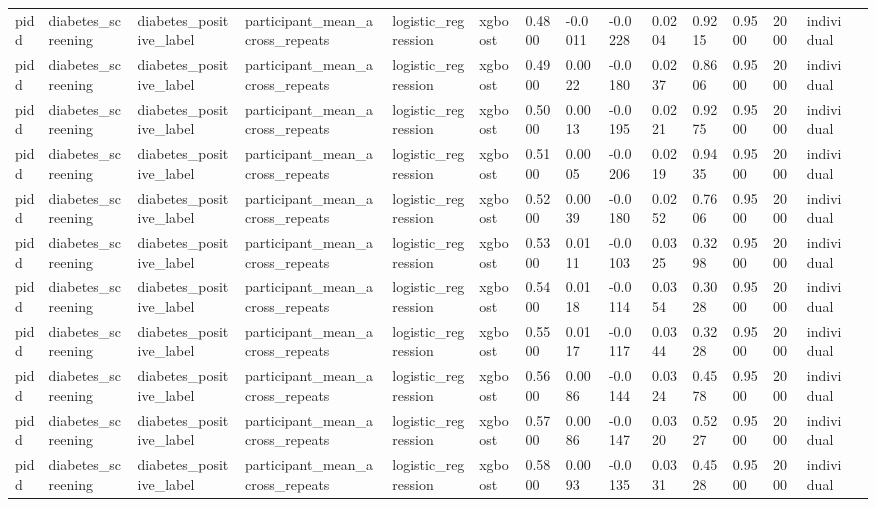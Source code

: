 \begin{tabular}{lllllllllllllll}
pidd & diabetes\_screening & diabetes\_positive\_label & participant\_mean\_across\_repeats & logistic\_regression & xgboost & 0.4800 & -0.0011 & -0.0228 & 0.0204 & 0.9215 & 0.9500 & 2000 & individual &  \\
pidd & diabetes\_screening & diabetes\_positive\_label & participant\_mean\_across\_repeats & logistic\_regression & xgboost & 0.4900 & 0.0022 & -0.0180 & 0.0237 & 0.8606 & 0.9500 & 2000 & individual &  \\
pidd & diabetes\_screening & diabetes\_positive\_label & participant\_mean\_across\_repeats & logistic\_regression & xgboost & 0.5000 & 0.0013 & -0.0195 & 0.0221 & 0.9275 & 0.9500 & 2000 & individual &  \\
pidd & diabetes\_screening & diabetes\_positive\_label & participant\_mean\_across\_repeats & logistic\_regression & xgboost & 0.5100 & 0.0005 & -0.0206 & 0.0219 & 0.9435 & 0.9500 & 2000 & individual &  \\
pidd & diabetes\_screening & diabetes\_positive\_label & participant\_mean\_across\_repeats & logistic\_regression & xgboost & 0.5200 & 0.0039 & -0.0180 & 0.0252 & 0.7606 & 0.9500 & 2000 & individual &  \\
pidd & diabetes\_screening & diabetes\_positive\_label & participant\_mean\_across\_repeats & logistic\_regression & xgboost & 0.5300 & 0.0111 & -0.0103 & 0.0325 & 0.3298 & 0.9500 & 2000 & individual &  \\
pidd & diabetes\_screening & diabetes\_positive\_label & participant\_mean\_across\_repeats & logistic\_regression & xgboost & 0.5400 & 0.0118 & -0.0114 & 0.0354 & 0.3028 & 0.9500 & 2000 & individual &  \\
pidd & diabetes\_screening & diabetes\_positive\_label & participant\_mean\_across\_repeats & logistic\_regression & xgboost & 0.5500 & 0.0117 & -0.0117 & 0.0344 & 0.3228 & 0.9500 & 2000 & individual &  \\
pidd & diabetes\_screening & diabetes\_positive\_label & participant\_mean\_across\_repeats & logistic\_regression & xgboost & 0.5600 & 0.0086 & -0.0144 & 0.0324 & 0.4578 & 0.9500 & 2000 & individual &  \\
pidd & diabetes\_screening & diabetes\_positive\_label & participant\_mean\_across\_repeats & logistic\_regression & xgboost & 0.5700 & 0.0086 & -0.0147 & 0.0320 & 0.5227 & 0.9500 & 2000 & individual &  \\
pidd & diabetes\_screening & diabetes\_positive\_label & participant\_mean\_across\_repeats & logistic\_regression & xgboost & 0.5800 & 0.0093 & -0.0135 & 0.0331 & 0.4528 & 0.9500 & 2000 & individual &  \\

\end{tabular}
